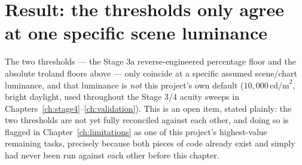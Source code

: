 

\section{Result: the thresholds only agree at one specific scene luminance}

The two thresholds --- the Stage 3a reverse-engineered percentage floor and the
absolute troland floors above --- only coincide at a specific assumed scene/chart
luminance, and that luminance is \emph{not} this project's own default
($10{,}000\,\text{cd/m}^2$, bright daylight, used throughout the Stage 3/4 acuity
sweeps in Chapters~\ref{ch:stage4}--\ref{ch:validation}). This is an open item, stated
plainly: the two thresholds are not yet fully reconciled against each other, and doing
so is flagged in Chapter~\ref{ch:limitations} as one of this project's highest-value
remaining tasks, precisely because both pieces of code already exist and simply had
never been run against each other before this chapter.
